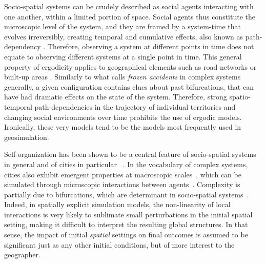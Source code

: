 \documentclass{JASSS}
\begin{document}
Socio-spatial systems can be crudely described as social agents interacting with one another, within a limited portion of space. Social agents thus constitute the microscopic level of the system, and they are framed by a system-time that evolves irreversibly, creating temporal and cumulative effects, also known as path-dependency \citep{arthur1994increasing}. Therefore, observing a system at different points in time does not equate to observing different systems at a single point in time. This general property of ergodicity applies to geographical elements such as road networks or built-up areas \citep{pumain2003approche}. Similarly to what \citet{gell1995quark} calls \emph{frozen accidents} in complex systems generally, a given configuration contains clues about past bifurcations, that can have had dramatic effects on the state of the system. Therefore, strong spatio-temporal path-dependencies in the trajectory of individual territories and changing social environments over time prohibits the use of ergodic models. Ironically, these very models tend to be the models most frequently used in geosimulation.


Self-organization has been shown to be a central feature of socio-spatial systems in general and of cities in particular ~\citep{AllenSanglier1981,saint1989villes, Portugali2000}. In the vocabulary of complex systems, cities also exhibit emergent properties at macroscopic scales~\citep{pumain2006hierarchy, AzizAlaouiBertelle2009}, which can be simulated through microscopic interactions between agents~\citep{Wu2002, batty2007cities}. Complexity is partially due to bifurcations, which are determinant in socio-spatial systems~\citep{Wilson1981, Wilson2002}. Indeed, in spatially explicit simulation models, the non-linearity of local interactions is very likely to sublimate small perturbations in the initial spatial setting, making it difficult to interpret the resulting global structures. In that sense, the impact of initial \emph{spatial} settings on final outcomes is assumed to be significant just as any other initial conditions, but of more interest to the geographer. \\
\end{document}
